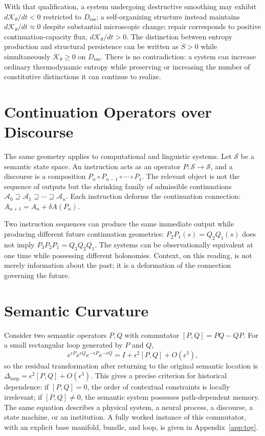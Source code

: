 \documentclass[11pt]{article}
\begin{document}
With that qualification, a system undergoing destructive smoothing may exhibit $d\mathcal{K}_\theta/dt < 0$ restricted to $D_{\mathrm{ess}}$; a self-organizing structure instead maintains $d\mathcal{K}_\theta/dt \approx 0$ despite substantial microscopic change; repair corresponds to positive continuation-capacity flux, $d\mathcal{K}_\theta/dt > 0$. The distinction between entropy production and structural persistence can be written as $\dot S > 0$ while simultaneously $\dot{\mathcal{K}}_\theta \geq 0$ on $D_{\mathrm{ess}}$. There is no contradiction: a system can increase ordinary thermodynamic entropy while preserving or increasing the number of constitutive distinctions it can continue to realize.

\section{Continuation Operators over Discourse}

The same geometry applies to computational and linguistic systems. Let $\mathcal{S}$ be a semantic state space. An instruction acts as an operator $P : \mathcal{S} \rightarrow \mathcal{S}$, and a discourse is a composition $P_n \circ P_{n-1} \circ \cdots \circ P_1$. The relevant object is not the sequence of outputs but the shrinking family of admissible continuations $\mathcal{A}_0 \supseteq \mathcal{A}_1 \supseteq \cdots \supseteq \mathcal{A}_n$. Each instruction deforms the continuation connection: $A_{n+1} = A_n + \delta A(P_n)$.

Two instruction sequences can produce the same immediate output while producing different future continuation geometries: $P_2 P_1(s) = Q_2 Q_1(s)$ does not imply $P_3 P_2 P_1 = Q_3 Q_2 Q_1$. The systems can be observationally equivalent at one time while possessing different holonomies. Context, on this reading, is not merely information about the past; it is a deformation of the connection governing the future.

\section{Semantic Curvature}

Consider two semantic operators $P, Q$ with commutator $[P,Q] = PQ - QP$. For a small rectangular loop generated by $P$ and $Q$,
\[
e^{\epsilon P} e^{\epsilon Q} e^{-\epsilon P} e^{-\epsilon Q} = I + \epsilon^2 [P,Q] + O(\epsilon^3),
\]
so the residual transformation after returning to the original semantic location is $\Delta_{\text{loop}} = \epsilon^2[P,Q] + O(\epsilon^3)$. This gives a precise criterion for historical dependence: if $[P,Q]=0$, the order of contextual constraints is locally irrelevant; if $[P,Q] \neq 0$, the semantic system possesses path-dependent memory. The same equation describes a physical system, a neural process, a discourse, a state machine, or an institution. A fully worked instance of this commutator, with an explicit base manifold, bundle, and loop, is given in Appendix~\ref{app:toy}.
\end{document}

